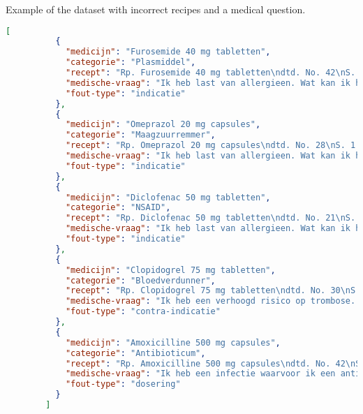 \documentclass[a4paper,doc,natbib]{apa6}
\begin{document}
    Example of the dataset with incorrect recipes and a medical question.
    \begin{lstlisting}[language=json]
        [
          {
            "medicijn": "Furosemide 40 mg tabletten",
            "categorie": "Plasmiddel",
            "recept": "Rp. Furosemide 40 mg tabletten\ndtd. No. 42\nS. 1 capsule elke 12 uur, met voedsel innemen.",
            "medische-vraag": "Ik heb last van allergieen. Wat kan ik hiervoor gebruiken?",
            "fout-type": "indicatie"
          },
          {
            "medicijn": "Omeprazol 20 mg capsules",
            "categorie": "Maagzuurremmer",
            "recept": "Rp. Omeprazol 20 mg capsules\ndtd. No. 28\nS. 1 tablet eenmaal daags voor het ontbijt.",
            "medische-vraag": "Ik heb last van allergieen. Wat kan ik hiervoor gebruiken?",
            "fout-type": "indicatie"
          },
          {
            "medicijn": "Diclofenac 50 mg tabletten",
            "categorie": "NSAID",
            "recept": "Rp. Diclofenac 50 mg tabletten\ndtd. No. 21\nS. 2 inhalaties zo nodig, maximaal 8x per dag.",
            "medische-vraag": "Ik heb last van allergieen. Wat kan ik hiervoor gebruiken?",
            "fout-type": "indicatie"
          },
          {
            "medicijn": "Clopidogrel 75 mg tabletten",
            "categorie": "Bloedverdunner",
            "recept": "Rp. Clopidogrel 75 mg tabletten\ndtd. No. 30\nS. 1 tablet 3x per dag na de maaltijd.",
            "medische-vraag": "Ik heb een verhoogd risico op trombose. Welke bloedverdunner kan ik gebruiken?",
            "fout-type": "contra-indicatie"
          },
          {
            "medicijn": "Amoxicilline 500 mg capsules",
            "categorie": "Antibioticum",
            "recept": "Rp. Amoxicilline 500 mg capsules\ndtd. No. 42\nS. 2 capsules 2x daags, gedurende 7 dagen.",
            "medische-vraag": "Ik heb een infectie waarvoor ik een antibioticum nodig heb. Welk middel kan ik gebruiken?",
            "fout-type": "dosering"
          }
        ]
    \end{lstlisting}
\end{document}
